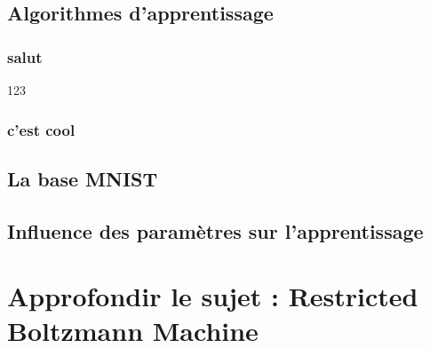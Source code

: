 \documentclass[a4paper,twoside]{report}
\begin{document}
		\chapter{Algorithmes d'apprentissage}

			\section{salut}

			123


			\section{c'est cool}


		\chapter{La base MNIST}

		\chapter{Influence des paramètres sur l'apprentissage}



	\part[Restricted Boltzmann Machine]{Approfondir le sujet : Restricted Boltzmann Machine}
\end{document}
